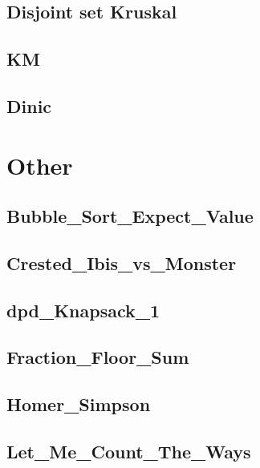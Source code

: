        \subsection{Disjoint set Kruskal}
                
        \subsection{KM}
                
        \subsection{Dinic}
                

\section{Other}
        \subsection{Bubble_Sort_Expect_Value}
                
        \subsection{Crested_Ibis_vs_Monster}
                
        \subsection{dpd_Knapsack_1}
                
        \subsection{Fraction_Floor_Sum}
                
        \subsection{Homer_Simpson}
                
        \subsection{Let_Me_Count_The_Ways}
                
